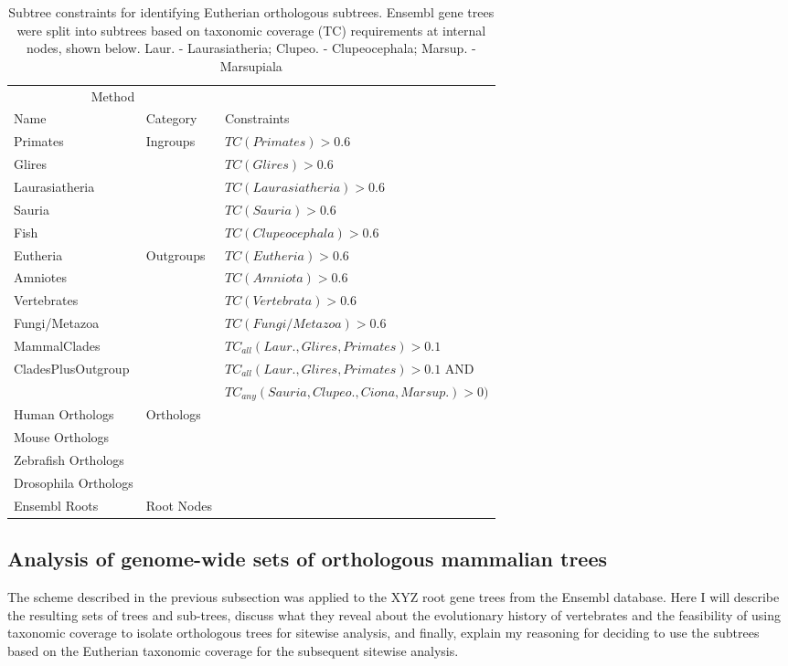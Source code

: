 \begin{table}[h] \footnotesize
\centering
\begin{tabular}{@{}lll@{}} \toprule
\multicolumn{2}{c}{Method} \\ \cmidrule(r){1-2}
   Name & Category & Constraints \\ \midrule
   Primates & Ingroups & $TC(Primates) > 0.6$ \\
   Glires & &  $TC(Glires) > 0.6$ \\
   Laurasiatheria & & $TC(Laurasiatheria) > 0.6$ \\
   Sauria & & $TC(Sauria) > 0.6$ \\
   Fish & & $TC(Clupeocephala) > 0.6$ \\
   Eutheria & Outgroups & $TC(Eutheria) > 0.6$ \\
   Amniotes & & $TC(Amniota) > 0.6$\\
   Vertebrates & & $TC(Vertebrata) > 0.6$\\
   Fungi/Metazoa & & $TC(Fungi/Metazoa) > 0.6$\\
   MammalClades & & $TC_{all}(Laur., Glires, Primates) > 0.1$\\
   CladesPlusOutgroup &  & $TC_{all}(Laur., Glires, Primates) > 0.1$ AND \\
    & & $TC_{any}(Sauria, Clupeo., Ciona, Marsup.) > 0)$ \\
   Human Orthologs & Orthologs & \\
   Mouse Orthologs &  &  \\
   Zebrafish Orthologs &  &  \\
   Drosophila Orthologs &  &  \\
   Ensembl Roots & Root Nodes  &  \\
\bottomrule
\end{tabular}
\caption{Subtree constraints for identifying Eutherian orthologous
  subtrees. Ensembl gene trees were split into subtrees based on
  taxonomic coverage (TC) requirements at internal nodes, shown
  below. Laur. - Laurasiatheria; Clupeo. - Clupeocephala; Marsup. -
  Marsupiala}
\label{subtree_constraints}
\end{table}

\subsection{Analysis of genome-wide sets of orthologous mammalian trees}

The scheme described in the previous subsection was applied to the XYZ
root gene trees from the Ensembl database. Here I will describe the
resulting sets of trees and sub-trees, discuss what they reveal about
the evolutionary history of vertebrates and the feasibility of using
taxonomic coverage to isolate orthologous trees for sitewise analysis,
and finally, explain my reasoning for deciding to use the subtrees
based on the Eutherian taxonomic coverage for the subsequent sitewise
analysis.

